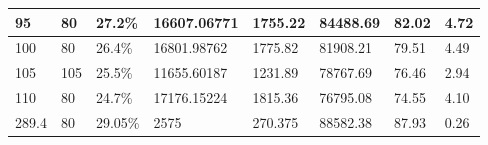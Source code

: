 \begin{table}[h!]
\begin{tabular}{|l|l|l|l|l|l|l|l|}
95                                                                                                & 80                                                                                                    & 27.2\%                                                                      & 16607.06771                                                                                    & 1755.22                                                                            & 84488.69                                                                            & 82.02              & 4.72                                                               \\ \hline
100                                                                                               & 80                                                                                                    & 26.4\%                                                                      & 16801.98762                                                                                    & 1775.82                                                                            & 81908.21                                                                            & 79.51              & 4.49                                                               \\ \hline
105                                                                                               & 105                                                                                                   & 25.5\%                                                                      & 11655.60187                                                                                    & 1231.89                                                                            & 78767.69                                                                            & 76.46              & 2.94                                                               \\ \hline
110                                                                                               & 80                                                                                                    & 24.7\%                                                                      & 17176.15224                                                                                    & 1815.36                                                                            & 76795.08                                                                            & 74.55              & 4.10  \\ \hline 
289.4 & 80 & 29.05\%&2575& 270.375&88582.38&87.93&0.26\\\hline
\end{tabular}
\label{MSF-X}
\end{table}




